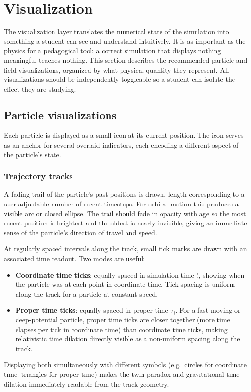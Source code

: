 \documentclass[11pt,a4paper]{article}
\begin{document}
\section{Visualization}

The visualization layer translates the numerical state of the simulation into something a student can see and understand intuitively.  It is as important as the physics for a pedagogical tool: a correct simulation that displays nothing meaningful teaches nothing.  This section describes the recommended particle and field visualizations, organized by what physical quantity they represent.  All visualizations should be independently toggleable so a student can isolate the effect they are studying.

\subsection{Particle visualizations}

Each particle is displayed as a small icon at its current position.  The icon serves as an anchor for several overlaid indicators, each encoding a different aspect of the particle's state.

\subsubsection*{Trajectory tracks}

A fading trail of the particle's past positions is drawn, length corresponding to a user-adjustable number of recent timesteps.  For orbital motion this produces a visible arc or closed ellipse.  The trail should fade in opacity with age so the most recent position is brightest and the oldest is nearly invisible, giving an immediate sense of the particle's direction of travel and speed.

At regularly spaced intervals along the track, small tick marks are drawn with an associated time readout.  Two modes are useful:
\begin{itemize}
  \item \textbf{Coordinate time ticks}: equally spaced in simulation time $t$, showing when the particle was at each point in coordinate time.  Tick spacing is uniform along the track for a particle at constant speed.
  \item \textbf{Proper time ticks}: equally spaced in proper time $\tau_i$.  For a fast-moving or deep-potential particle, proper time ticks are closer together (more time elapses per tick in coordinate time) than coordinate time ticks, making relativistic time dilation directly visible as a non-uniform spacing along the track.
\end{itemize}
Displaying both simultaneously with different symbols (e.g.\ circles for coordinate time, triangles for proper time) makes the twin paradox and gravitational time dilation immediately readable from the track geometry.
\end{document}
